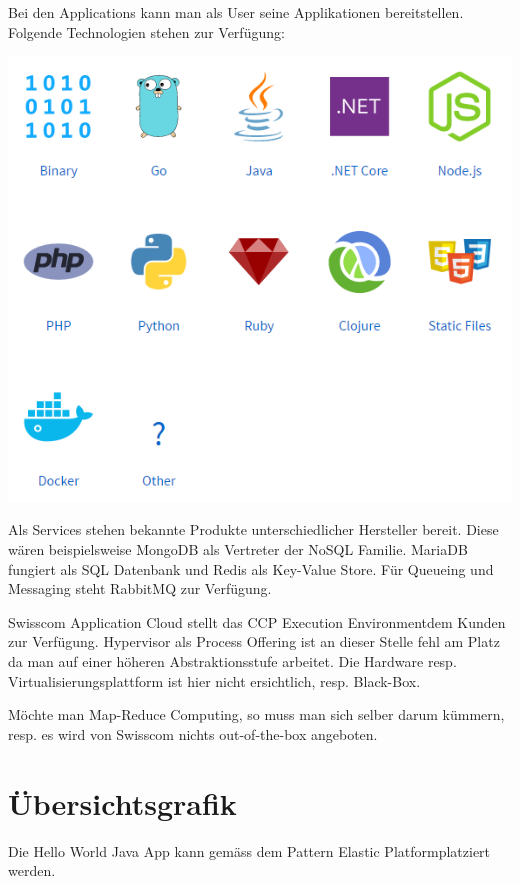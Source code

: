 Bei den Applications kann man als User seine Applikationen bereitstellen. Folgende Technologien stehen zur Verfügung:

\includegraphics[scale=0.7]{images/applications.png}

Als Services stehen bekannte Produkte unterschiedlicher Hersteller bereit. Diese wären beispielsweise MongoDB als Vertreter der NoSQL Familie. MariaDB fungiert als SQL Datenbank und Redis als Key-Value Store. Für Queueing und Messaging steht RabbitMQ zur Verfügung. 

Swisscom Application Cloud stellt das CCP \glqq Execution Environment\grqq dem Kunden zur Verfügung. Hypervisor als Process Offering ist an dieser Stelle fehl am Platz da man auf einer höheren Abstraktionsstufe arbeitet. Die Hardware resp. Virtualisierungsplattform ist hier nicht ersichtlich, resp. Black-Box. 

Möchte man Map-Reduce Computing, so muss man sich selber darum kümmern, resp. es wird von Swisscom nichts out-of-the-box angeboten.

\section{Übersichtsgrafik}
Die Hello World Java App kann gemäss dem Pattern \glqq Elastic Platform\grqq platziert werden.

